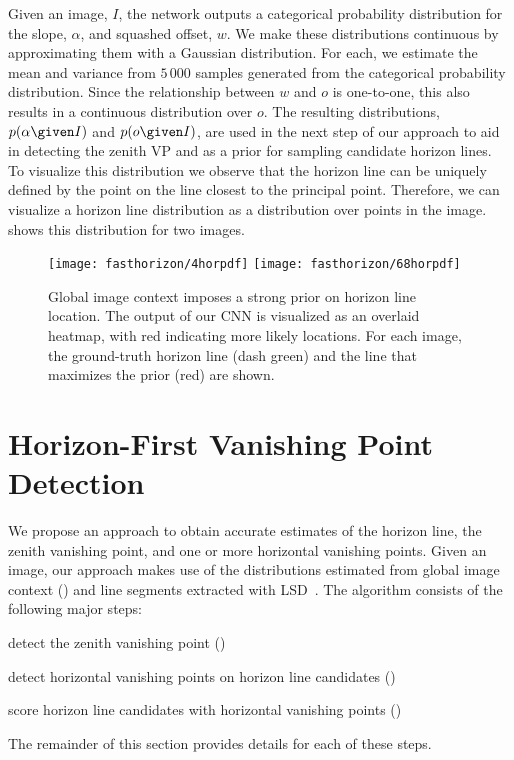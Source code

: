 Given an image, $I$, the network outputs a categorical probability
distribution for the slope, $\alpha$, and squashed offset, $w$. We
make these distributions continuous by approximating them with a
Gaussian distribution. For each, we estimate the mean and variance
from $5\,000$ samples generated from the categorical probability
distribution. Since the relationship between $w$ and $o$ is
one-to-one, this also results in a continuous distribution over
$o$. The resulting distributions, $p(\alpha \given I)$ and $p(o \given
I)$, are used in the next step of our approach to aid in detecting the
zenith VP and as a prior for sampling candidate horizon
lines. To visualize this distribution we observe that the horizon line
can be uniquely defined by the point on the line closest to the
principal point. Therefore, we can visualize a horizon line
distribution as a distribution over points in the image.
 shows this distribution for two images.

\begin{figure}
 \centering
 \texttt{[image: fasthorizon/4horpdf]}
 \hfill
 \texttt{[image: fasthorizon/68horpdf]}

 \caption{Global image context imposes a strong prior on horizon line
   location. The output of our CNN is visualized as an overlaid
   heatmap, with red indicating more likely locations. For each image,
   the ground-truth horizon line (dash green) and the line that
   maximizes the prior (red) are shown.}

 \label{fig:horpdf}
\end{figure}

\section{Horizon-First Vanishing Point Detection}
\label{sec:precise}

We propose an approach to obtain accurate estimates of the horizon
line, the zenith vanishing point, and one or more horizontal vanishing
points. Given an image, our approach makes use of the distributions
estimated from global image context () and
line segments extracted with LSD~\cite{lsd2010}. The algorithm
consists of the following major steps:
\begin{compactenum} %

  \item detect the zenith vanishing point
    ()

  \item \label{alg:findhorvp} detect horizontal vanishing points on
    horizon line candidates
    ()

  \item \label{alg:scorehorizon} score horizon line candidates with
    horizontal vanishing points ()

\end{compactenum}
The remainder of this section provides details for each of these steps.

